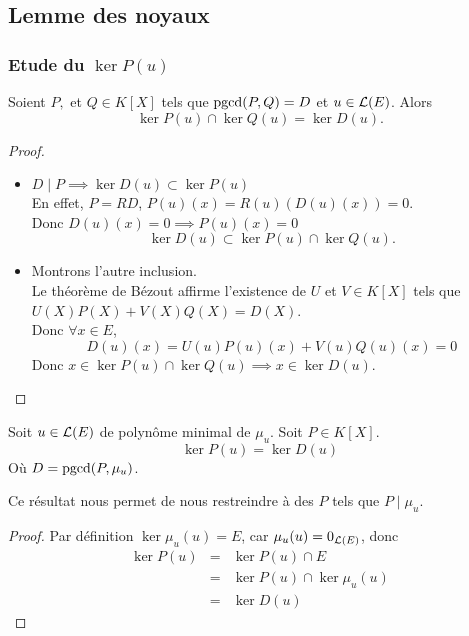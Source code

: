 \subsection{Lemme des noyaux}

\subsubsection{Etude du $\ker P(u)$}


\begin{prop}
	Soient $P,$ et $Q \in K[X]$ tels que $\text{pgcd}(P,Q) = D$ et $u \in \mathcal{L}(E)$.
	Alors
	$$\ker P(u) \cap \ker Q(u) = \ker D(u).$$
\end{prop}

\begin{proof}
	\begin{itemize}
		\item $D \mid P \implies \ker D(u) \subset \ker P(u)$\\
		      En effet, $P = RD$, $P(u)(x) = R(u)(D(u)(x)) = 0$.\\
		      Donc $D(u)(x) = 0 \implies P(u)(x) = 0$
		      $$ \ker D(u) \subset \ker P(u) \cap \ker Q(u).$$

		\item Montrons l'autre inclusion.\\
		      Le théorème de Bézout affirme l'existence de $U$ et $V \in K[X]$ tels que $U(X)P(X) + V(X)Q(X) = D(X)$.\\
		      Donc $\forall x \in E$,
		      $$ D(u)(x) = U(u)P(u)(x) + V(u)Q(u)(x) = 0$$
		      Donc $x \in \ker P(u) \cap \ker Q(u) \implies x \in \ker D(u)$.
	\end{itemize}
\end{proof}

\begin{coro}
	Soit $u \in \mathcal{L}(E)$ de polynôme minimal de $\mu_u$.
	Soit $P \in K[X]$.
	$$\ker P(u) = \ker D(u)$$
	Où $D = \text{pgcd}(P,\mu_u)$.
\end{coro}

\begin{remarque}
	Ce résultat nous permet de nous restreindre à des $P$ tels que $P \mid \mu_u$.
\end{remarque}


\begin{proof}
	Par définition $\ker \mu_u(u) = E$, car $\mu_u(u) = 0_{\mathcal{L}(E)}$, donc
	\begin{eqnarray*}
		\ker P(u)  &=& \ker P(u) \cap E \\
		&=& \ker P(u) \cap \ker \mu_u(u) \\
		&=& \ker D(u)
	\end{eqnarray*}
\end{proof}

